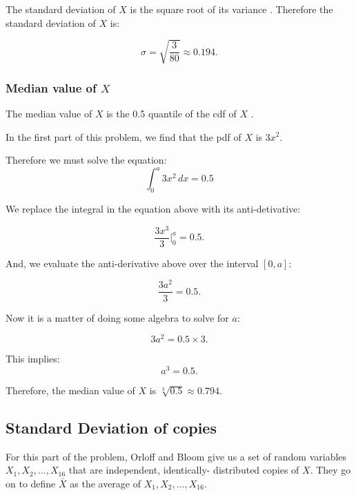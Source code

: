 \documentclass[a4paper,11pt]{article}
\begin{document}
The standard deviation of $X$ is the square root of its variance \cite{reading6a}.  Therefore the standard deviation of $X$ is:

\begin{equation}
\sigma=\sqrt{\frac{3}{80}} \approx
  0.194.
\end{equation}

\subsubsection{Median value of $X$}
The median value of $X$ is the 0.5
quantile of the cdf of $X$
\cite{reading6a}.

In the first part of this problem,
we find that the pdf of $X$ is
$3x^2$.

Therefore we must solve the equation:
\begin{equation}
\int_0^a 3x^2 \,dx = 0.5
\end{equation}

We replace the integral in the
equation above with its
anti-detivative:

\begin{equation}
\frac{3x^3}{3} \bigg\rvert_0^a=0.5.
\end{equation}

And, we evaluate the anti-derivative
above over the interval $\left[0,a
\right]$:

\begin{equation}
\frac{3a^2}{3}=0.5.
\end{equation}

Now it is a matter of doing some
algebra to solve for $a$:

\begin{equation}
3a^2=0.5 \times 3.
\end{equation}

This implies:
\begin{equation}
a^3=0.5.
\end{equation}

Therefore, the median value of $X$ is
$\sqrt[3]{0.5} \approx 0.794$.

\subsection{Standard Deviation of
copies}

For this part of the problem, Orloff
and Bloom give us a set of
random variables $X_1, X_2, \ldots,
X_16$ that are independent, identically-
distributed copies of $X$.
They go on to define $\bar{X}$ as the
average of $X_1, X_2, \ldots, X_16$.
\end{document}
